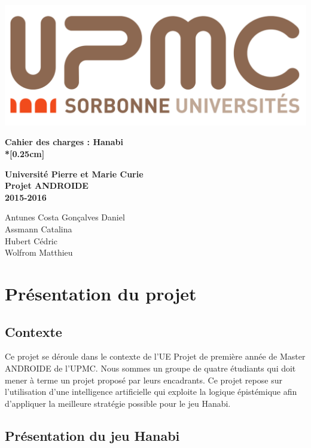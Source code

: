 \documentclass{article}
\begin{document}
\begin{flushright}
\includegraphics[scale = 0.2]{upmc.png}
\end{flushright}

\begin{center}
\par\vspace {2.5cm}
{\Huge\textbf{Cahier des charges : Hanabi\\*[0.25cm]}}   
\par\vspace {2cm}
{\Large\textbf{Université Pierre et Marie Curie\\ Projet ANDROIDE\\
               2015-2016}}                   
\par\vspace {2cm}
{\Large{Antunes Costa Gonçalves Daniel}}\\
{\Large{Assmann Catalina}}\\ 
{\Large{Hubert Cédric}}\\ 
{\Large{Wolfrom Matthieu}}\\
\end{center}

\newpage
\section{Présentation du projet}

\subsection{Contexte}

Ce projet se déroule dans le contexte de l’UE Projet de première année de Master ANDROIDE de l’UPMC.  Nous sommes un groupe de quatre étudiants qui doit mener à terme un projet proposé par leurs encadrants. Ce projet repose sur l’utilisation d’une intelligence artificielle qui exploite la logique épistémique afin d’appliquer la meilleure stratégie possible pour le jeu Hanabi. 
\subsection{Présentation du jeu Hanabi}
\end{document}
